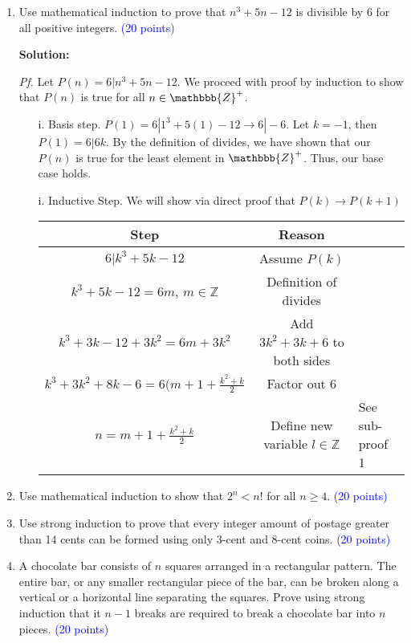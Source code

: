 \documentclass{article}
\newcommand{\pt}[1]{\textcolor{blue}{(#1 points)}}
\newenvironment{solution}
{
\par
\color{blue}
\textbf{Solution:}
}
{
\par
}
\begin{document}
\clearpage
\begin{enumerate}



\item Use mathematical induction to prove that $n^3 +5n -12$ is divisible by $6$ for all positive integers. \pt{20}

\begin{solution}
\newline
\textit{Pf.} Let $P(n) = 6 | n^3 + 5n - 12$. We proceed with proof by induction to show that $P(n)$ is true for all $n \in \mathbbb{Z}^+$.
\begin{enumerate}
    \item[i.] Basis step. $P(1) = 6 | 1^3 + 5(1) -12 \rightarrow 6 | -6$. Let $k=-1$, then $P(1) = 6|6k$. By the definition of divides, we have shown that our $P(n)$ is true for the least element in $\mathbbb{Z}^+$. Thus, our base case holds.
    \item[i.] Inductive Step. We will show via direct proof that $P(k) \rightarrow P(k+1)$
    \begin{tabular}{c|c}
        Step & Reason \\
        \hline
        $6 | k^3 + 5k - 12$ & Assume $P(k)$ \\
        $k^3 + 5k -12 = 6m$, $m \in \mathbb{Z}$ & Definition of divides\\
        $k^3+3k-12+3k^2=6m+3k^2$ & Add $3k^2+3k+6$ to both sides \\
        $k^3+3k^2+8k-6 = 6(m+1+\frac{k^2+k}{2}$ & Factor out 6 \\
        $n = m+1+\frac{k^2+k}{2}$ & Define new variable
        $l \in \mathbb{Z}$ & See sub-proof 1
        
    \end{tabular}
\end{enumerate}
\end{solution}

\item Use mathematical induction to show that $2^n < n!$ for all $n \geq 4$. \pt{20}

\item Use strong induction to prove that every integer amount of postage greater than 14 cents can be formed using only 3-cent and 8-cent coins. \pt{20}

\item A chocolate bar consists of $n$ squares arranged in a rectangular pattern. The entire bar, or any smaller rectangular piece of the bar, can be broken along a vertical or a horizontal line separating the squares. Prove using strong induction that it $n-1$ breaks are required to break a chocolate bar into $n$ pieces. \pt{20}


\end{enumerate}
\end{document}
